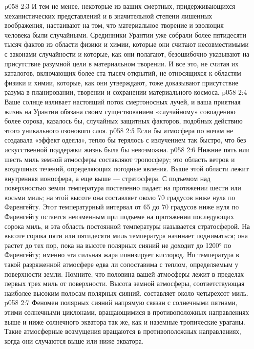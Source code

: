 \vs p058 2:3 И тем не менее, некоторые из ваших смертных, придерживающихся механистических представлений и в значительной степени лишенных воображения, настаивают на том, что материальное творение и эволюция человека были случайными. Срединники Урантии уже собрали более пятидесяти тысяч фактов из области физики и химии, которые они считают несовместимыми с законами случайности и которые, как они полагают, безошибочно указывают на присутствие разумной цели в материальном творении. И все это, не считая их каталогов, включающих более ста тысяч открытий, не относящихся к областям физики и химии, которые, как они утверждают, тоже доказывают присутствие разума в планировании, творении и сохранении материального космоса.
\vs p058 2:4 Ваше солнце изливает настоящий поток смертоносных лучей, и ваша приятная жизнь на Урантии обязана своим существованием «случайному» совпадению более сорока, казалось бы, случайных защитных факторов, подобных действию этого уникального озонового слоя.
\vs p058 2:5 Если бы атмосфера по ночам не создавала «эффект одеяла», тепло бы терялось с излучением так быстро, что без искусственной поддержки жизнь была бы невозможна.
\vs p058 2:6 \pc Нижние пять или шесть миль земной атмосферы составляют тропосферу; это область ветров и воздушных течений, определяющих погодные явления. Выше этой области лежит внутренняя ионосфера, а еще выше --- стратосфера. С подъемом над поверхностью земли температура постепенно падает на протяжении шести или восьми миль; на этой высоте она составляет около 70 градусов ниже нуля по Фаренгейту. Этот температурный интервал от 65 до 70 градусов ниже нуля по Фаренгейту остается неизменным при подъеме на протяжении последующих сорока миль, и эта область постоянной температуры называется стратосферой. На высоте сорока пяти или пятидесяти миль температура начинает подниматься; она растет до тех пор, пока на высоте полярных сияний не доходит до 1200° по Фаренгейту; именно эта сильная жара ионизирует кислород. Но температура в такой разряженной атмосфере едва ли сопоставима с теплом, определяемым у поверхности земли. Помните, что половина вашей атмосферы лежит в пределах первых трех миль от поверхности. Высота земной атмосферы, соответствующая наиболее высоким полосам полярных сияний, составляет около четырехсот миль.
\vs p058 2:7 Феномен полярных сияний напрямую связан с солнечными пятнами, этими солнечными циклонами, вращающимися в противоположных направлениях выше и ниже солнечного экватора так же, как и наземные тропические ураганы. Такие атмосферные возмущения вращаются в противоположных направлениях, когда они случаются выше или ниже экватора.
